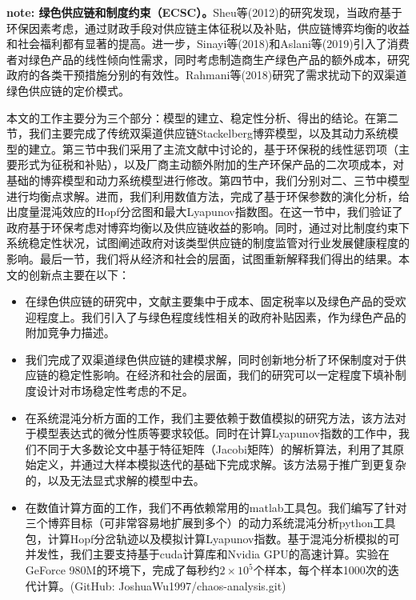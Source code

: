 \documentclass{article}
\begin{document}
\par \textbf{note: 绿色供应链和制度约束（ECSC）\cite{2005Beamon}。}Sheu等(2012)\cite{2012Sheu}的研究发现，当政府基于环保因素考虑，通过财政手段对供应链主体征税以及补贴，供应链博弈均衡的收益和社会福利都有显著的提高。进一步，Sinayi等(2018)\cite{2018Sinayi}和Aslani等(2019)\cite{2019Aslani}引入了消费者对绿色产品的线性倾向性需求，同时考虑制造商生产绿色产品的额外成本，研究政府的各类干预措施分别的有效性。Rahmani等(2018)\cite{2018Rahami}研究了需求扰动下的双渠道绿色供应链的定价模式。
\par 本文的工作主要分为三个部分：模型的建立、稳定性分析、得出的结论。在第二节，我们主要完成了传统双渠道供应链Stackelberg博弈模型，以及其动力系统模型的建立。第三节中我们采用了主流文献中讨论的，基于环保税的线性惩罚项（主要形式为征税和补贴），以及厂商主动额外附加的生产环保产品的二次项成本，对基础的博弈模型和动力系统模型进行修改。第四节中，我们分别对二、三节中模型进行均衡点求解。进而，我们利用数值方法，完成了基于环保参数的演化分析，给出度量混沌效应的Hopf分岔图和最大Lyapunov指数图。在这一节中，我们验证了政府基于环保考虑对博弈均衡以及供应链收益的影响。同时，通过对比制度约束下系统稳定性状况，试图阐述政府对该类型供应链的制度监管对行业发展健康程度的影响。最后一节，我们将从经济和社会的层面，试图重新解释我们得出的结果。本文的创新点主要在以下：%
\begin{itemize}
    \item 在绿色供应链的研究中，文献主要集中于成本、固定税率以及绿色产品的受欢迎程度上。我们引入了与绿色程度线性相关的政府补贴因素，作为绿色产品的附加竞争力描述。
    \item 我们完成了双渠道绿色供应链的建模求解，同时创新地分析了环保制度对于供应链的稳定性影响。在经济和社会的层面，我们的研究可以一定程度下填补制度设计对市场稳定性考虑的不足。
    \item 在系统混沌分析方面的工作，我们主要依赖于数值模拟的研究方法，该方法对于模型表达式的微分性质等要求较低。同时在计算Lyapunov指数的工作中，我们不同于大多数论文中基于特征矩阵（Jacobi矩阵）的解析算法，利用了其原始定义，并通过大样本模拟迭代的基础下完成求解。该方法易于推广到更复杂的，以及无法显式求解的模型中去。
    \item 在数值计算方面的工作，我们不再依赖常用的matlab工具包。我们编写了针对三个博弈目标（可非常容易地扩展到多个）的动力系统混沌分析python工具包，计算Hopf分岔轨迹以及模拟计算Lyapunov指数。基于混沌分析模拟的可并发性，我们主要支持基于cuda计算库和Nvidia GPU的高速计算。实验在GeForce 980M的环境下，完成了每秒约$2\times10^5$个样本，每个样本1000次的迭代计算。(GitHub: JoshuaWu1997/chaos-analysis.git)
\end{itemize}
\end{document}

